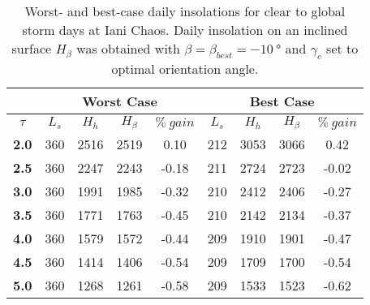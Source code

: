 \begin{table}[h]
\footnotesize
\centering
\caption[Worst- and best-case daily insolations for global storm days at Iani Chaos]
{Worst- and best-case daily insolations for clear to global storm days at Iani Chaos. Daily insolation on an inclined surface $H_{\beta}$ was obtained with $\beta = \beta_{best} = \SI{-10}{\degree}$ and $\gamma_{c}$ set to optimal orientation angle.}
\label{tab:insolation-iani-chaos-global-storm-days}
\begin{tabular}{c|c|c|c|c|c|c|c|c|}
\cline{2-9}
\multicolumn{1}{l|}{} & \multicolumn{4}{c|}{\textbf{Worst Case}} & \multicolumn{4}{c|}{\textbf{Best Case}} \\ \hline
\multicolumn{1}{|c|}{$\tau$} & $L_{s}$ & $H_{h}$ & $H_{\beta}$ & $\%\:gain$ & $L_{s}$ & $H_{h}$ & $H_{\beta}$ & $\%\:gain$ \\ \hline
\multicolumn{1}{|c|}{\textbf{2.0}} & 360 & 2516 & 2519 & 0.10 & 212 & 3053 & 3066 & 0.42 \\ \hline
\multicolumn{1}{|c|}{\textbf{2.5}} & 360 & 2247 & 2243 & -0.18 & 211 & 2724 & 2723 & -0.02 \\ \hline
\multicolumn{1}{|c|}{\textbf{3.0}} & 360 & 1991 & 1985 & -0.32 & 210 & 2412 & 2406 & -0.27 \\ \hline
\multicolumn{1}{|c|}{\textbf{3.5}} & 360 & 1771 & 1763 & -0.45 & 210 & 2142 & 2134 & -0.37 \\ \hline
\multicolumn{1}{|c|}{\textbf{4.0}} & 360 & 1579 & 1572 & -0.44 & 209 & 1910 & 1901 & -0.47 \\ \hline
\multicolumn{1}{|c|}{\textbf{4.5}} & 360 & 1414 & 1406 & -0.54 & 209 & 1709 & 1700 & -0.54 \\ \hline
\multicolumn{1}{|c|}{\textbf{5.0}} & 360 & 1268 & 1261 & -0.58 & 209 & 1533 & 1523 & -0.62 \\ \hline
\end{tabular}
\end{table}
